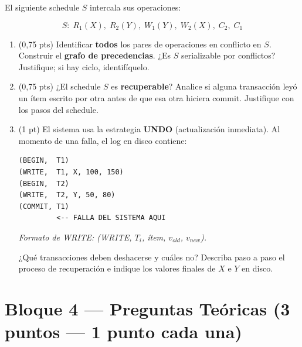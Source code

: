 \documentclass[11pt,a4paper]{article}
\begin{document}
El siguiente schedule $S$ intercala sus operaciones:

\[
S:\; R_1(X),\; R_2(Y),\; W_1(Y),\; W_2(X),\; C_2,\; C_1
\]

\begin{enumerate}
  \item (0{,}75 pts) Identificar \textbf{todos} los pares de operaciones en conflicto en $S$. Construir el \textbf{grafo de precedencias}. ¿Es $S$ serializable por conflictos? Justifique; si hay ciclo, identifíquelo.

  \vspace{5cm}

  \item (0{,}75 pts) ¿El schedule $S$ es \textbf{recuperable}? Analice si alguna transacción leyó un ítem escrito por otra antes de que esa otra hiciera commit. Justifique con los pasos del schedule.

  \vspace{4cm}

  \item (1 pt) El sistema usa la estrategia \textbf{UNDO} (actualización inmediata). Al momento de una falla, el log en disco contiene:

\begin{lstlisting}[style=log]
(BEGIN,  T1)
(WRITE,  T1, X, 100, 150)
(BEGIN,  T2)
(WRITE,  T2, Y, 50, 80)
(COMMIT, T1)
         <-- FALLA DEL SISTEMA AQUI
\end{lstlisting}

  \noindent\small\textit{Formato de WRITE: (WRITE, $T_i$, ítem, $v_{old}$, $v_{new}$).}

  \normalsize\vspace{4pt}
  ¿Qué transacciones deben deshacerse y cuáles no? Describa paso a paso el proceso de recuperación e indique los valores finales de $X$ e $Y$ en disco.

  \vspace{4.5cm}
\end{enumerate}

\newpage

\section*{Bloque 4 — Preguntas Teóricas \hfill\normalfont(3 puntos — 1 punto cada una)}
\end{document}
